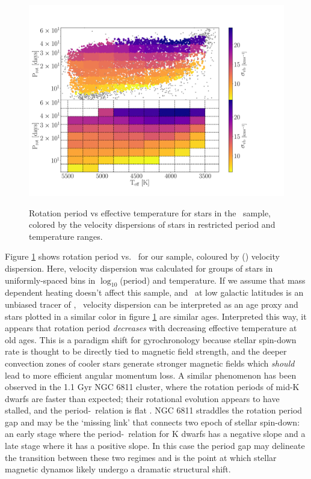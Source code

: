 \begin{figure}
  \caption{
Rotation period vs effective temperature for stars in the \mct\ sample,
    colored by the velocity dispersions of stars in restricted period and
    temperature ranges.
}
  \centering
    \includegraphics[width=1\textwidth]{vplot}
\label{fig:dispersion_period_teff}
\end{figure}
Figure \ref{fig:dispersion_period_teff} shows rotation period vs. \teff\ for
our sample, coloured by (\vb) velocity dispersion.
Here, velocity dispersion was calculated for groups of stars in
uniformly-spaced bins in $\log_{10}$(period) and temperature.
If we assume that mass dependent heating doesn't affect this sample, and \vb\
at low galactic latitudes is an unbiased tracer of \vz, \vb\ velocity
dispersion can be interpreted as an age proxy and stars plotted in a similar
color in figure \ref{fig:dispersion_period_teff} are similar ages.
Interpreted this way, it appears that rotation period {\it decreases} with
decreasing effective temperature at old ages.  This is a paradigm shift
for gyrochronology because stellar spin-down rate is thought to be directly
tied to magnetic field strength, and the deeper convection zones of cooler
stars generate stronger magnetic fields which {\it should} lead to more
efficient angular momentum loss.
A similar phenomenon has been observed in the 1.1 Gyr NGC 6811 cluster, where
the rotation periods of mid-K dwarfs are faster than expected; their
rotational evolution appears to have stalled, and the period-\teff\ relation
is flat \citep{curtis2019}.
NGC 6811 straddles the rotation period gap and may be the `missing link' that
connects two epoch of stellar spin-down: an early stage where the
period-\teff\ relation for K dwarfs has a negative slope and a late stage
where it has a positive slope.
In this case the period gap may delineate the transition between these two
regimes and is the point at which stellar magnetic dynamos likely undergo a
dramatic structural shift.


